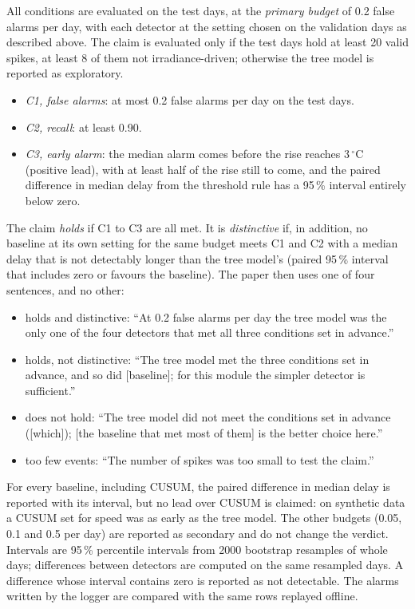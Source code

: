 \documentclass[conference]{IEEEtran}
\newcommand{\degC}{\ensuremath{^\circ}C}
\begin{document}
All conditions are evaluated on the test days, at the \emph{primary budget} of 0.2 false
alarms per day, with each detector at the setting chosen on the validation days as
described above. The claim is evaluated only if the test days hold at least 20 valid
spikes, at least 8 of them not irradiance-driven; otherwise the tree model is reported
as exploratory.
\begin{itemize}
\item \emph{C1, false alarms}: at most 0.2 false alarms per day on the test days.
\item \emph{C2, recall}: at least 0.90.
\item \emph{C3, early alarm}: the median alarm comes before the rise reaches 3\,\degC{}
(positive lead), with at least half of the rise still to come, and the paired difference
in median delay from the threshold rule has a 95\,\% interval entirely below zero.
\end{itemize}
The claim \emph{holds} if C1 to C3 are all met. It is \emph{distinctive} if, in addition,
no baseline at its own setting for the same budget meets C1 and C2 with a median delay
that is not detectably longer than the tree model's (paired 95\,\% interval that
includes zero or favours the baseline). The paper then uses one of four sentences, and no other:
\begin{itemize}
\item holds and distinctive: ``At 0.2 false alarms per day the tree model was the only
one of the four detectors that met all three conditions set in advance.''
\item holds, not distinctive: ``The tree model met the three conditions set in advance,
and so did [baseline]; for this module the simpler detector is sufficient.''
\item does not hold: ``The tree model did not meet the conditions set in advance
([which]); [the baseline that met most of them] is the better choice here.''
\item too few events: ``The number of spikes was too small to test the claim.''
\end{itemize}
For every baseline, including CUSUM, the paired difference in median delay is reported
with its interval, but no lead over CUSUM is claimed: on synthetic data a CUSUM set for
speed was as early as the tree model. The other budgets (0.05, 0.1 and 0.5 per day) are
reported as secondary and do not change the verdict.
Intervals are 95\,\% percentile intervals from 2000 bootstrap resamples of whole days;
differences between detectors are computed on the same resampled days. A difference
whose interval contains zero is reported as not detectable. The alarms written by the
logger are compared with the same rows replayed offline.
\end{document}
